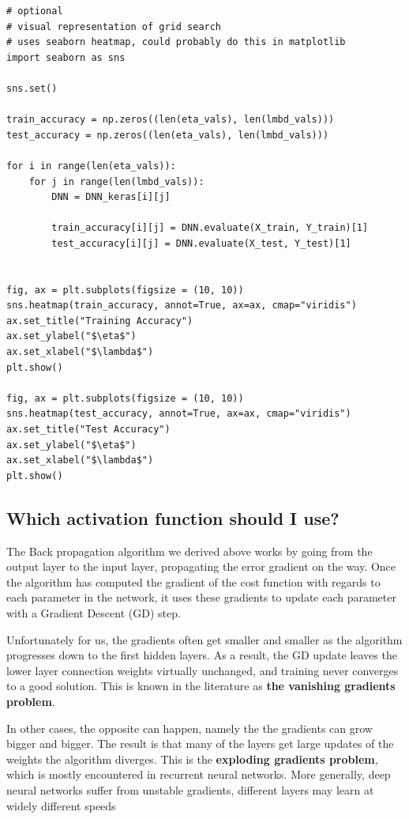 \documentclass[%
oneside,                 %
final,                   %
10pt]{article}
\begin{document}
\begin{verbatim}
# optional
# visual representation of grid search
# uses seaborn heatmap, could probably do this in matplotlib
import seaborn as sns

sns.set()

train_accuracy = np.zeros((len(eta_vals), len(lmbd_vals)))
test_accuracy = np.zeros((len(eta_vals), len(lmbd_vals)))

for i in range(len(eta_vals)):
    for j in range(len(lmbd_vals)):
        DNN = DNN_keras[i][j]

        train_accuracy[i][j] = DNN.evaluate(X_train, Y_train)[1]
        test_accuracy[i][j] = DNN.evaluate(X_test, Y_test)[1]

        
fig, ax = plt.subplots(figsize = (10, 10))
sns.heatmap(train_accuracy, annot=True, ax=ax, cmap="viridis")
ax.set_title("Training Accuracy")
ax.set_ylabel("$\eta$")
ax.set_xlabel("$\lambda$")
plt.show()

fig, ax = plt.subplots(figsize = (10, 10))
sns.heatmap(test_accuracy, annot=True, ax=ax, cmap="viridis")
ax.set_title("Test Accuracy")
ax.set_ylabel("$\eta$")
ax.set_xlabel("$\lambda$")
plt.show()
\end{verbatim}




\subsection*{Which activation function should I use?}

The Back propagation algorithm we derived above works by going from
the output layer to the input layer, propagating the error gradient on
the way. Once the algorithm has computed the gradient of the cost
function with regards to each parameter in the network, it uses these
gradients to update each parameter with a Gradient Descent (GD) step.


Unfortunately for us, the gradients often get smaller and smaller as the
algorithm progresses down to the first hidden layers. As a result, the
GD update leaves the lower layer connection weights
virtually unchanged, and training never converges to a good
solution. This is known in the literature as 
\textbf{the vanishing gradients problem}. 

In other cases, the opposite can happen, namely the the gradients can grow bigger and
bigger. The result is that many of the layers get large updates of the 
weights the
algorithm diverges. This is the \textbf{exploding gradients problem}, which is
mostly encountered in recurrent neural networks. More generally, deep
neural networks suffer from unstable gradients, different layers may
learn at widely different speeds
\end{document}
